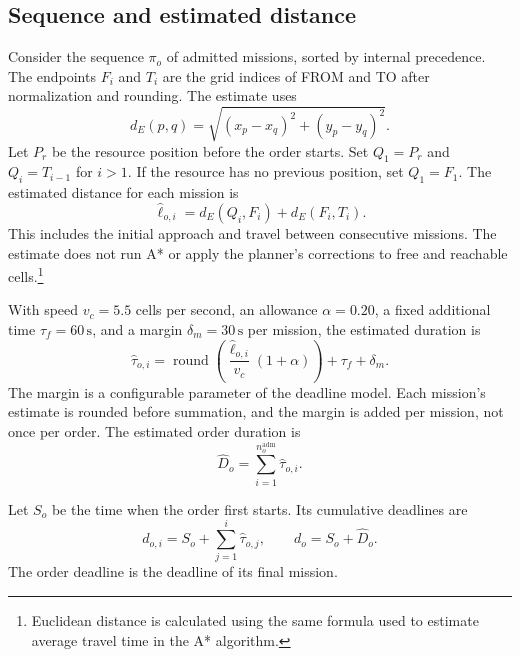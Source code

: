 \subsection{Sequence and estimated distance}

Consider the sequence $\pi_o$ of admitted missions, sorted by internal precedence.
The endpoints $F_i$ and $T_i$ are the grid indices of FROM and TO after
normalization and rounding. The estimate uses
\begin{equation}
    d_E(p,q)=\sqrt{(x_p-x_q)^2+(y_p-y_q)^2}.
    \label{eq:manhattan-distance} %
\end{equation}
Let $P_r$ be the resource position before the order starts. Set $Q_1=P_r$ and
$Q_i=T_{i-1}$ for $i>1$. If the resource has no previous position, set $Q_1=F_1$.
The estimated distance for each mission is
\begin{equation}
    \widehat\ell_{o,i}=d_E(Q_i,F_i)+d_E(F_i,T_i).
    \label{eq:estimated-order-distance}
\end{equation}
This includes the initial approach and travel between consecutive missions.
The estimate does not run A* or apply the planner's corrections to free and
reachable cells.\footnote{Euclidean distance is calculated using the same formula
used to estimate average travel time in the A* algorithm.}

With speed $v_c=5.5$ cells per second, an allowance $\alpha=0.20$, a fixed
additional time $\tau_f=60\,\mathrm{s}$, and a margin
$\delta_m=30\,\mathrm{s}$ per mission, the estimated duration is
\begin{equation}
    \widehat\tau_{o,i}=
    \operatorname{round}\!\left(
    \frac{\widehat\ell_{o,i}}{v_c}(1+\alpha)\right)
    +\tau_f+\delta_m.
    \label{eq:stima_scadenze}
\end{equation}
The margin is a configurable parameter of the deadline model. Each mission's
estimate is rounded before summation, and the margin is added per mission,
not once per order. The estimated order duration is
\begin{equation}
    \widehat D_o=\sum_{i=1}^{n_o^{\mathrm{adm}}}\widehat\tau_{o,i}.
    \label{eq:estimated-order-duration}
\end{equation}

Let $S_o$ be the time when the order first starts. Its cumulative deadlines are
\begin{equation}
    d_{o,i}=S_o+\sum_{j=1}^{i}\widehat\tau_{o,j},\qquad
    d_o=S_o+\widehat D_o.
    \label{eq:estimated-order-deadline}
\end{equation}
The order deadline is the deadline of its final mission.

